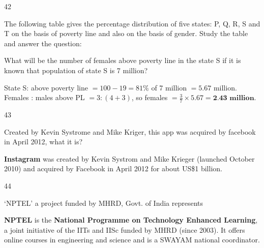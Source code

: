 \begin{question}{42}
{The following table gives the percentage distribution of five states: P, Q, R, S and T on the basis of poverty line and also on the basis of gender. Study the table and answer the question:\par}
What will be the number of females above poverty line in the state S if it is known that population of state S is 7 million?
\begin{explain}
State S: above poverty line $=100-19=81\%$ of 7 million $=5.67$ million.
Females : males above PL $=3:(4+3)$, so females $=\tfrac37\times5.67=\textbf{2.43 million}$.
\end{explain}
\end{question}

\begin{question}{43}
{Created by Kevin Systrome and Mike Kriger, this app was acquired by facebook in April 2012, what it is?\par}
\begin{explain}
\textbf{Instagram} was created by Kevin Systrom and Mike Krieger (launched October 2010) and acquired by Facebook in April 2012 for about US\$1 billion.
\end{explain}
\end{question}

\begin{question}{44}
{`NPTEL' a project funded by MHRD, Govt. of India represents \blank{}\par}
\begin{explain}
\textbf{NPTEL} is the \textbf{National Programme on Technology Enhanced Learning}, a joint initiative of the IITs and IISc funded by MHRD (since 2003). It offers online courses in engineering and science and is a SWAYAM national coordinator.
\end{explain}
\end{question}

